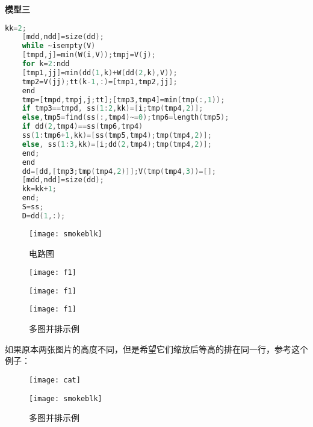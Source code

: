 \documentclass[withoutpreface,bwprint]{cumcmthesis} %
\begin{document}
\begin{appendices}
\textbf{模型三}

\begin{lstlisting}[language=c]
	kk=2;
	[mdd,ndd]=size(dd);
	while ~isempty(V)
	[tmpd,j]=min(W(i,V));tmpj=V(j);
	for k=2:ndd
	[tmp1,jj]=min(dd(1,k)+W(dd(2,k),V));
	tmp2=V(jj);tt(k-1,:)=[tmp1,tmp2,jj];
	end
	tmp=[tmpd,tmpj,j;tt];[tmp3,tmp4]=min(tmp(:,1));
	if tmp3==tmpd, ss(1:2,kk)=[i;tmp(tmp4,2)];
	else,tmp5=find(ss(:,tmp4)~=0);tmp6=length(tmp5);
	if dd(2,tmp4)==ss(tmp6,tmp4)
	ss(1:tmp6+1,kk)=[ss(tmp5,tmp4);tmp(tmp4,2)];
	else, ss(1:3,kk)=[i;dd(2,tmp4);tmp(tmp4,2)];
	end;
	end
	dd=[dd,[tmp3;tmp(tmp4,2)]];V(tmp(tmp4,3))=[];
	[mdd,ndd]=size(dd);
	kk=kk+1;
	end;
	S=ss;
	D=dd(1,:);
\end{lstlisting}














\begin{figure}[!h]
	\centering
	\texttt{[image: smokeblk]}
	\caption{电路图}
	\label{fig:circuit-diagram}
\end{figure}




\begin{figure}
	\centering
	\begin{minipage}[c]{0.3\textwidth}
		\centering
		\texttt{[image: f1]}
		\label{fig:sample-figure-a}
	\end{minipage}
	\begin{minipage}[c]{0.3\textwidth}
		\centering
		\texttt{[image: f1]}
		\label{fig:sample-figure-b}
	\end{minipage}
	\begin{minipage}[c]{0.3\textwidth}
		\centering
		\texttt{[image: f1]}
		\label{fig:sample-figure-c}
	\end{minipage}
	\caption{多图并排示例}
	\label{fig:sample-figure}
\end{figure}








如果原本两张图片的高度不同，但是希望它们缩放后等高的排在同一行，参考这个例子：
\begin{figure}
	\centering
	\begin{minipage}[c]{0.48\textwidth}
		\centering
		\texttt{[image: cat]}
	\end{minipage}
	\begin{minipage}[c]{0.48\textwidth}
		\centering
		\texttt{[image: smokeblk]}
	\end{minipage}
	\caption{多图并排示例}
\end{figure}










\end{appendices}
\end{document}
